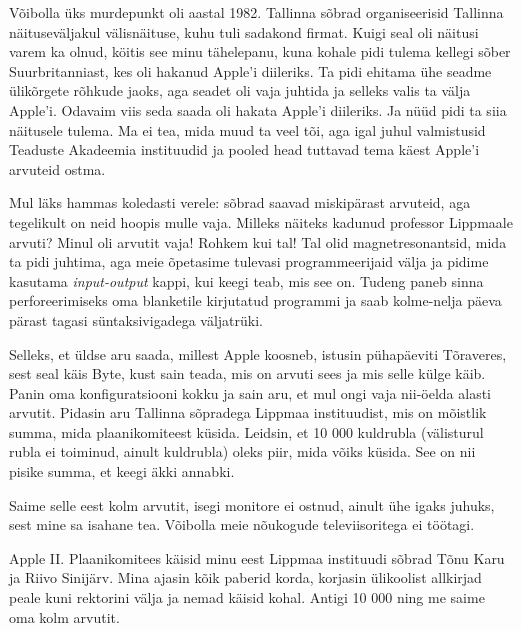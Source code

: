 Võibolla üks murdepunkt oli aastal 1982. Tallinna
sõbrad organiseerisid Tallinna näituseväljakul välisnäituse, kuhu tuli sadakond firmat. Kuigi seal oli näitusi varem ka olnud, köitis see minu tähelepanu, kuna
kohale pidi tulema kellegi sõber
Suurbritanniast, kes oli hakanud Apple'i diileriks. Ta pidi ehitama ühe seadme ülikõrgete rõhkude jaoks,
aga seadet oli vaja juhtida ja selleks valis ta välja Apple'i.
Odavaim viis seda saada oli hakata Apple'i diileriks. Ja nüüd pidi ta siia
näitusele tulema. Ma ei tea, mida muud ta veel tõi, aga igal juhul valmistusid
Teaduste Akadeemia instituudid ja pooled head
tuttavad tema käest Apple'i arvuteid ostma.

Mul läks hammas
koledasti verele: sõbrad saavad miskipärast arvuteid, aga tegelikult on neid
hoopis mulle vaja. Milleks näiteks kadunud professor Lippmaale arvuti? Minul oli arvutit vaja! Rohkem
kui tal! Tal olid magnetresonantsid, mida ta pidi juhtima,
aga meie õpetasime tulevasi programmeerijaid välja ja pidime kasutama
\emph{input-output} kappi, kui keegi teab, mis see on. Tudeng paneb sinna
perforeerimiseks oma blanketile kirjutatud programmi ja saab kolme-nelja päeva
pärast tagasi süntaksivigadega väljatrüki.

Selleks, et üldse aru saada, millest
Apple koosneb, istusin pühapäeviti Tõraveres,
sest seal käis Byte, kust sain teada,
mis on arvuti sees ja mis selle külge käib. Panin oma konfiguratsiooni kokku ja sain aru, et mul ongi vaja nii-öelda
alasti arvutit. Pidasin aru Tallinna sõpradega Lippmaa
instituudist, mis on
mõistlik summa, mida plaanikomiteest küsida. Leidsin, et 10 000 kuldrubla (välisturul rubla
ei toiminud, ainult kuldrubla) oleks piir, mida võiks küsida. See on
nii pisike summa, et keegi äkki annabki.

Saime selle eest kolm arvutit, isegi
monitore ei ostnud, ainult ühe igaks juhuks, sest mine sa isahane tea. Võibolla meie
nõukogude televiisoritega ei töötagi.


Apple II. Plaanikomitees käisid minu eest Lippmaa
instituudi sõbrad Tõnu Karu ja Riivo
Sinijärv. Mina ajasin kõik paberid korda, korjasin
ülikoolist allkirjad peale kuni rektorini välja ja nemad käisid kohal. Antigi 10 000 ning me saime oma kolm arvutit.

